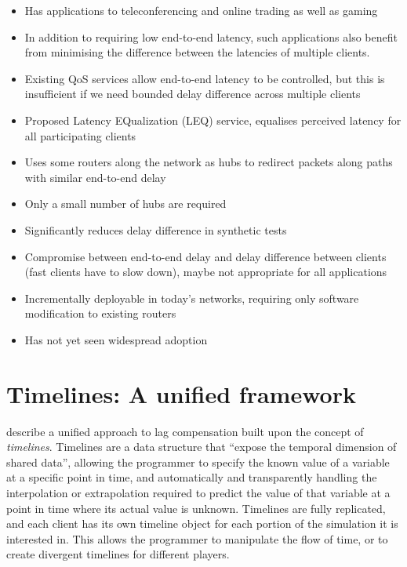 \documentclass[conference]{IEEEtran}
\begin{document}
	\begin{itemize}
		\item Has applications to teleconferencing and online trading as well as gaming
		\item In addition to requiring low end-to-end latency, such applications also benefit from minimising the difference between the latencies of multiple clients.
		\item Existing QoS services allow end-to-end latency to be controlled, but this is insufficient if we need bounded delay difference across multiple clients
		\item Proposed Latency EQualization (LEQ) service, equalises perceived latency for all participating clients
		\item Uses some routers along the network as hubs to redirect packets along paths with similar end-to-end delay
		\item Only a small number of hubs are required
		\item Significantly reduces delay difference in synthetic tests
		\item Compromise between end-to-end delay and delay difference between clients (fast clients have to slow down), maybe not appropriate for all applications
		\item Incrementally deployable in today's networks, requiring only software modification to existing routers
		\item Has not yet seen widespread adoption
	\end{itemize}

	\section{Timelines: A unified framework}

	\Textcite{savery2013timelines} describe a unified approach to lag compensation built upon the concept of \emph{timelines}. Timelines are a data structure that ``expose the temporal dimension of shared data'', allowing the programmer to specify the known value of a variable at a specific point in time, and automatically and transparently handling the interpolation or extrapolation required to predict the value of that variable at a point in time where its actual value is unknown. Timelines are fully replicated, and each client has its own timeline object for each portion of the simulation it is interested in. This allows the programmer to manipulate the flow of time, or to create divergent timelines for different players.
\end{document}
